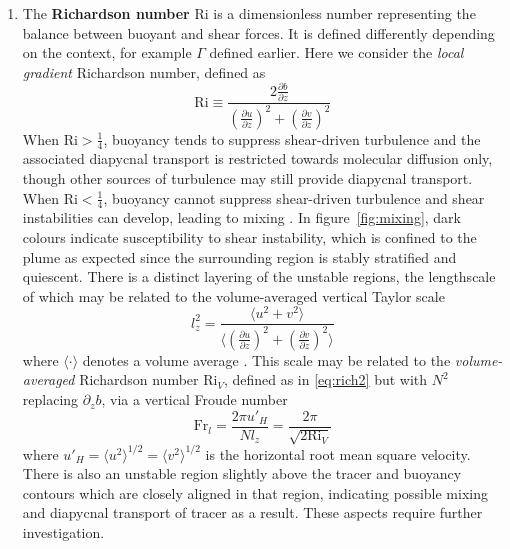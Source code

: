 \documentclass[a4paper]{article}
\begin{document}
\begin{enumerate}[label=(\alph*)]
	\item The \textbf{Richardson number} $\mathrm{Ri}$ is a dimensionless number representing the balance
		between buoyant and shear forces. It is defined differently depending on the context, for example
		$\Gamma$ defined earlier. Here we consider the \emph{local gradient} Richardson number, defined as
		\begin{equation}
			\mathrm{Ri} \equiv \frac{2\frac{\partial b}{\partial z}}{\left(\frac{\partial u}{\partial
			z}\right)^2 + \left(\frac{\partial v}{\partial z}\right)^2}
			\label{eq:rich2}
		\end{equation}
		When $\mathrm{Ri} > \frac{1}{4}$, buoyancy tends to suppress shear-driven turbulence and the
		associated diapycnal transport is restricted towards molecular diffusion only, though other sources of
		turbulence may still provide diapycnal transport. When $\mathrm{Ri} < \frac{1}{4}$, buoyancy cannot
		suppress shear-driven turbulence and shear instabilities can develop, leading to mixing
		\citep{ivey2008}. In figure~\ref{fig:mixing}, dark colours indicate susceptibility to shear
		instability, which is confined to the plume as expected since the surrounding region is stably
		stratified and quiescent. There is a distinct layering of the unstable regions, the lengthscale of
		which may be related to the volume-averaged vertical Taylor scale
		\begin{equation}
			l_z^2 = \frac{\langle u^2 + v^2 \rangle}{\langle \left(\frac{\partial u}{\partial z}\right)^2 +
		\left(\frac{\partial v}{\partial z}\right)^2 \rangle}
		\end{equation}
		where $\langle \cdot \rangle$ denotes a volume average \citep{riley2003}. This scale may be related to
		the \emph{volume-averaged} Richardson number $\mathrm{Ri}_V$, defined as in \eqref{eq:rich2} but with
		$N^2$ replacing $\partial_z b$, via a vertical Froude number
		\begin{equation}
			\mathrm{Fr}_l = \frac{2\pi u'_H}{N l_z} = \frac{2\pi}{\sqrt{2\mathrm{Ri}_V}}
		\end{equation}
		where $u'_H = \langle u^2 \rangle^{1/2} = \langle v^2 \rangle^{1/2}$ is the horizontal root mean
		square velocity. There is also an unstable region slightly above the tracer and buoyancy contours
		which are closely aligned in that region, indicating possible mixing and diapycnal transport of tracer
		as a result. These aspects require further investigation.


\end{enumerate}
\end{document}
